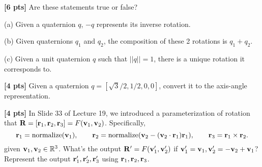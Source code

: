 \begin{questions}

    \question \textbf{[6 pts]} Are these statements true or false?

    (a) Given a quaternion $q$, $-q$ represents its inverse rotation.

    \begin{tcolorbox}[fit,height=5cm, width=\textwidth, blank, borderline={0.5pt}{-2pt},halign=left, valign=center, nobeforeafter]


    \end{tcolorbox}

    (b) Given quaternions $q_1$ and $q_2$, the composition of these 2 rotations is $q_1 + q_2$.

    \begin{tcolorbox}[fit,height=5cm, width=\textwidth, blank, borderline={0.5pt}{-2pt},halign=left, valign=center, nobeforeafter]


    \end{tcolorbox}

    (c) Given a unit quaternion $q$ such that $||q||=1$, there is a unique rotation it corresponds to.

    \begin{tcolorbox}[fit,height=5cm, width=\textwidth, blank, borderline={0.5pt}{-2pt},halign=left, valign=center, nobeforeafter]


    \end{tcolorbox}

    \clearpage

    \question \textbf{[4 pts]} Given a quaternion $q = [\sqrt{3}/2, 1/2, 0, 0]$, convert it to the axis-angle representation.

    \begin{tcolorbox}[fit,height=5cm, width=\textwidth, blank, borderline={0.5pt}{-2pt},halign=left, valign=center, nobeforeafter]


    \end{tcolorbox}



    \question \textbf{[4 pts]} In Slide 33 of Lecture 19, we introduced a parameterization of rotation that $\mathbf{R} = [\mathbf{r}_1, \mathbf{r}_2, \mathbf{r}_3] = F(\mathbf{v}_1, \mathbf{v}_2)$. Specifically,
    \begin{equation*}
        \mathbf{r}_1 = \text{normalize}(\mathbf{v}_1), \qquad \mathbf{r}_2 = \text{normalize}(\mathbf{v}_2 - (\mathbf{v}_2 \cdot \mathbf{r}_1)\mathbf{r}_1), \qquad \mathbf{r}_3 = \mathbf{r}_1 \times \mathbf{r}_2.
    \end{equation*}
    given $\mathbf{v}_1, \mathbf{v}_2 \in \mathbb{R}^3$. What's the output $\mathbf{R}'= F(\mathbf{v}_1',\mathbf{v}_2')$ if $\mathbf{v}_1'=\mathbf{v}_1, \mathbf{v}_2' = -\mathbf{v}_2+\mathbf{v}_1$? Represent the output $\mathbf{r}_1', \mathbf{r}_2', \mathbf{r}_3'$ using $\mathbf{r}_1, \mathbf{r}_2, \mathbf{r}_3$.


\end{questions}

